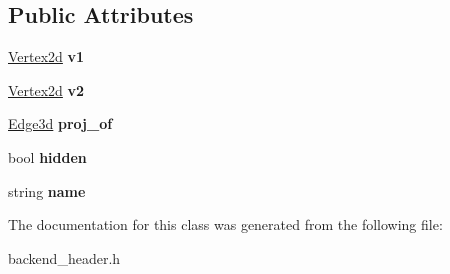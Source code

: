 \subsection*{Public Attributes}
\begin{DoxyCompactItemize}
\item 
\hyperlink{classVertex2d}{Vertex2d} {\bfseries v1}\hypertarget{classEdge2d_a30f08d6392d2f0536687ac9f8eccb8f6}{}\label{classEdge2d_a30f08d6392d2f0536687ac9f8eccb8f6}

\item 
\hyperlink{classVertex2d}{Vertex2d} {\bfseries v2}\hypertarget{classEdge2d_aeb751a8cd6057d339b2389019487af07}{}\label{classEdge2d_aeb751a8cd6057d339b2389019487af07}

\item 
\hyperlink{classEdge3d}{Edge3d} {\bfseries proj\+\_\+of}\hypertarget{classEdge2d_adc9804b436746303fb3e883923eefdcf}{}\label{classEdge2d_adc9804b436746303fb3e883923eefdcf}

\item 
bool {\bfseries hidden}\hypertarget{classEdge2d_a2fefb205405c8af2d8e78c2cfabdc4c5}{}\label{classEdge2d_a2fefb205405c8af2d8e78c2cfabdc4c5}

\item 
string {\bfseries name}\hypertarget{classEdge2d_aebf763e48b3e401921dbfe3cc2aab879}{}\label{classEdge2d_aebf763e48b3e401921dbfe3cc2aab879}

\end{DoxyCompactItemize}


The documentation for this class was generated from the following file\+:\begin{DoxyCompactItemize}
\item 
backend\+\_\+header.\+h\end{DoxyCompactItemize}
